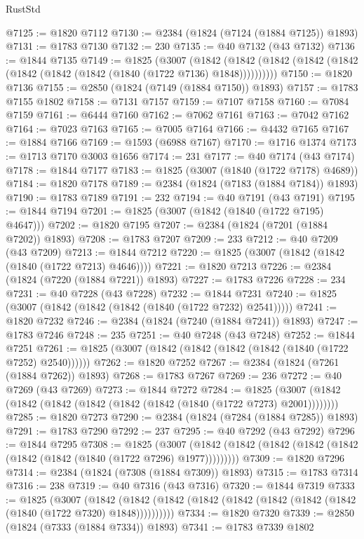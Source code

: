 \begin{lexlean}{RustStd}
\begin{coremodule}
@7125 := @1820 @7112
@7130 := @2384 (@1824 (@7124 (@1884 @7125)) @1893)
@7131 := @1783 @7130
@7132 := 230
@7135 := @40 @7132 (@43 @7132)
@7136 := @1844 @7135
@7149 := @1825
    (@3007
      (@1842 (@1842 (@1842 (@1842 (@1842 (@1842 (@1842 (@1842 (@1840 (@1722 @7136) @1848))))))))))
@7150 := @1820 @7136
@7155 := @2850 (@1824 (@7149 (@1884 @7150)) @1893)
@7157 := @1783 @7155 @1802
@7158 := @7131 @7157
@7159 := @7107 @7158
@7160 := @7084 @7159
@7161 := @6444 @7160
@7162 := @7062 @7161
@7163 := @7042 @7162
@7164 := @7023 @7163
@7165 := @7005 @7164
@7166 := @4432 @7165
@7167 := @1884 @7166
@7169 := @1593 (@6988 @7167)
@7170 := @1716 @1374
@7173 := @1713 @7170 @3003 @1656
@7174 := 231
@7177 := @40 @7174 (@43 @7174)
@7178 := @1844 @7177
@7183 := @1825 (@3007 (@1840 (@1722 @7178) @4689))
@7184 := @1820 @7178
@7189 := @2384 (@1824 (@7183 (@1884 @7184)) @1893)
@7190 := @1783 @7189
@7191 := 232
@7194 := @40 @7191 (@43 @7191)
@7195 := @1844 @7194
@7201 := @1825 (@3007 (@1842 (@1840 (@1722 @7195) @4647)))
@7202 := @1820 @7195
@7207 := @2384 (@1824 (@7201 (@1884 @7202)) @1893)
@7208 := @1783 @7207
@7209 := 233
@7212 := @40 @7209 (@43 @7209)
@7213 := @1844 @7212
@7220 := @1825 (@3007 (@1842 (@1842 (@1840 (@1722 @7213) @4646))))
@7221 := @1820 @7213
@7226 := @2384 (@1824 (@7220 (@1884 @7221)) @1893)
@7227 := @1783 @7226
@7228 := 234
@7231 := @40 @7228 (@43 @7228)
@7232 := @1844 @7231
@7240 := @1825 (@3007 (@1842 (@1842 (@1842 (@1840 (@1722 @7232) @2541)))))
@7241 := @1820 @7232
@7246 := @2384 (@1824 (@7240 (@1884 @7241)) @1893)
@7247 := @1783 @7246
@7248 := 235
@7251 := @40 @7248 (@43 @7248)
@7252 := @1844 @7251
@7261 := @1825 (@3007 (@1842 (@1842 (@1842 (@1842 (@1840 (@1722 @7252) @2540))))))
@7262 := @1820 @7252
@7267 := @2384 (@1824 (@7261 (@1884 @7262)) @1893)
@7268 := @1783 @7267
@7269 := 236
@7272 := @40 @7269 (@43 @7269)
@7273 := @1844 @7272
@7284 := @1825 (@3007 (@1842 (@1842 (@1842 (@1842 (@1842 (@1842 (@1840 (@1722 @7273) @2001))))))))
@7285 := @1820 @7273
@7290 := @2384 (@1824 (@7284 (@1884 @7285)) @1893)
@7291 := @1783 @7290
@7292 := 237
@7295 := @40 @7292 (@43 @7292)
@7296 := @1844 @7295
@7308 := @1825
    (@3007 (@1842 (@1842 (@1842 (@1842 (@1842 (@1842 (@1842 (@1840 (@1722 @7296) @1977)))))))))
@7309 := @1820 @7296
@7314 := @2384 (@1824 (@7308 (@1884 @7309)) @1893)
@7315 := @1783 @7314
@7316 := 238
@7319 := @40 @7316 (@43 @7316)
@7320 := @1844 @7319
@7333 := @1825
    (@3007
      (@1842 (@1842 (@1842 (@1842 (@1842 (@1842 (@1842 (@1842 (@1840 (@1722 @7320) @1848))))))))))
@7334 := @1820 @7320
@7339 := @2850 (@1824 (@7333 (@1884 @7334)) @1893)
@7341 := @1783 @7339 @1802

\end{coremodule}
\end{lexlean}
